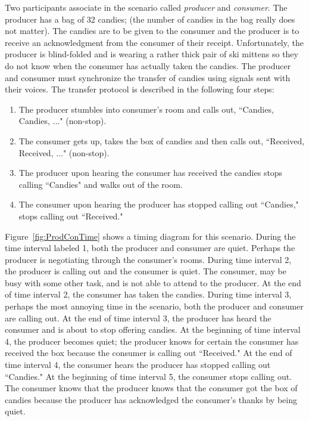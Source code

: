 Two participants associate in the scenario called {\it producer} and 
{\it consumer}.  The producer has a bag of 32 candies; (the number of 
candies in the bag really does not matter). The candies are to be given to
the consumer and the producer is to receive an acknowledgment from the consumer of their receipt.
Unfortunately, the producer is blind-folded 
and is wearing a rather thick pair of ski mittens so they do not know
when the consumer has actually taken the candies.  The producer and 
consumer must synchronize the transfer of candies using signals sent
with their voices.  The transfer protocol is described in the 
following four steps:

\begin{enumerate}
\item The producer stumbles into consumer's room and calls out, 
``Candies, Candies, $\ldots$"  (non-stop).

\item The consumer gets up, takes the box of candies and then calls
out, ``Received, Received, $\ldots$" (non-stop).  

\item The producer upon hearing the consumer has received the candies
stops calling ``Candies" and walks out of the room. 

\item The consumer upon hearing the producer has stopped 
calling out ``Candies," stops calling out ``Received."
\end{enumerate}

Figure~\ref{fig:ProdConTime} shows a timing diagram for this scenario.
During the time interval labeled 1, both the producer and consumer are
quiet.  Perhaps the producer is negotiating through the 
consumer's rooms.  During time interval 2, the producer is calling out 
and the consumer is quiet.  The consumer, may be busy with some other
task, and is not able to attend to the producer. At the end of time
interval 2, the consumer has taken the candies.  During time interval 3,
perhaps the most annoying time in the scenario, both the producer and
consumer are calling out.  At the end of time interval 3, the producer 
has heard the consumer and is about to stop offering candies.
At the beginning of time 
interval 4, the producer becomes quiet; the producer knows for certain 
the consumer has received the box because the consumer is calling out
``Received."  At the end of time interval 4, the consumer hears the 
producer has stopped calling out ``Candies."  At the beginning of time
interval 5, the consumer stops calling out.  The consumer knows that the
producer knows that the consumer got the box of candies  because the
producer has acknowledged the consumer's thanks by being quiet.

